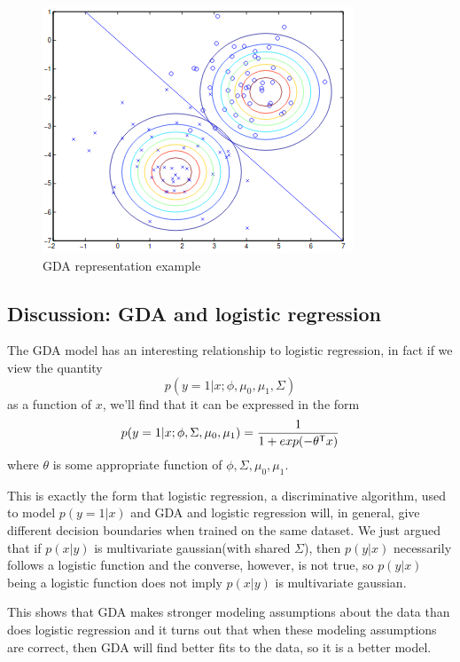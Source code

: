 \begin{figure}
    \caption{GDA representation example}
    \label{img:gdaExample}
    \includegraphics[width=\textwidth]{images/gda}
\end{figure}

\subsection{Discussion: GDA and logistic regression}

The GDA model has an interesting relationship to logistic regression, in fact if we view the quantity 
\[ p(y = 1 | x; \phi, \mu_0, \mu_1, \Sigma) \]
as a function of $x$, we’ll find that it can be expressed in the form
\[ p(y = 1 | x; \phi, \Sigma, \mu_0, \mu_1) = \frac{1}{1 + exp(-\theta ^ \mathsf{T}x)} \]
where $\theta$ is some appropriate function of $\phi, \Sigma, \mu_0, \mu_1$.

This is exactly the form that logistic regression, a discriminative algorithm, used to model 
$p(y = 1 | x)$ and GDA and logistic regression will, in general, give different decision boundaries
when trained on the same dataset.\newline
We just argued that if $p(x | y)$ is multivariate gaussian(with shared $\Sigma$), then $p(y | x)$
necessarily follows a logistic function and the converse, however, is not true, so $p(y | x)$
being a logistic function does not imply $p(x | y)$ is multivariate gaussian.

This shows that GDA makes stronger modeling assumptions about the data than does logistic regression and 
it turns out that when these modeling assumptions are correct, then GDA will find better fits to the data, 
so it is a better model.

